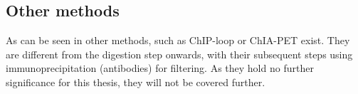 





\subsection{Other methods}\label{sec:other3c}

As can be seen in  other methods, such as ChIP-loop or ChIA-PET
exist. They are different from the digestion step onwards, with their
subsequent steps using immunoprecipitation (antibodies) for filtering. As they
hold no further significance for this thesis, they will not be covered further.


%
%
%
%
%
%






